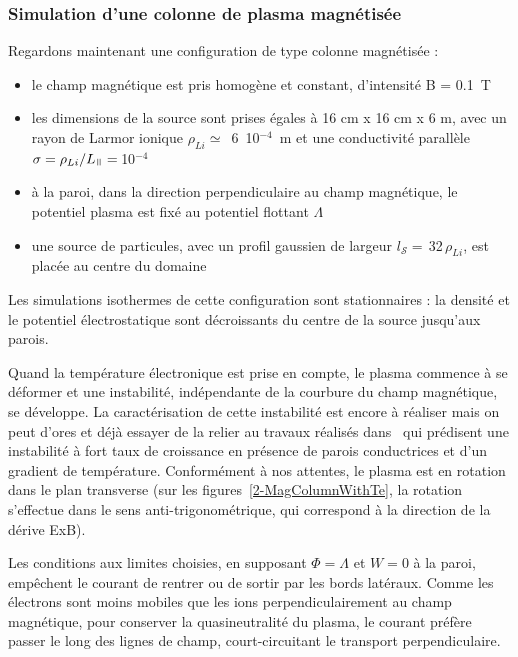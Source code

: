 \begin{refsection}
\subsubsection{Simulation d'une colonne de plasma magnétisée}
Regardons maintenant une configuration de type colonne magnétisée : 

\begin{itemize}
  \item le champ magnétique est pris homogène et constant, d'intensité B = 0.1~T
  \item les dimensions de la source sont prises égales à 16 cm x
  16 cm x 6 m, avec un rayon
  de Larmor ionique $\rho_{Li}\simeq$~6~10$^{-4}$~m et une conductivité
  parallèle $\sigma=\rho_{Li}/L_\para=\,$10$^{-4}$
  \item à la paroi, dans la direction perpendiculaire au champ magnétique, le
  potentiel plasma est fixé au potentiel flottant $\Lambda$
  \item une source de particules, avec un profil gaussien de largeur
  $l_{\mathcal S}=\,$32$\,\rho_{Li}$, est placée au centre du domaine
\end{itemize}

Les simulations isothermes de cette configuration sont stationnaires : la
densité et le potentiel électrostatique sont décroissants du centre de la
source jusqu'aux parois. 

Quand la température électronique est prise en compte,
le plasma commence à se déformer et une instabilité, indépendante de la
courbure du champ magnétique, se développe.
La caractérisation de cette instabilité est encore à réaliser
mais on peut d'ores et déjà essayer de la relier au travaux
réalisés dans~\parencite{Berk} qui prédisent une instabilité à fort taux de
croissance en présence de parois conductrices et d'un gradient de température.
Conformément à nos attentes, le plasma est en rotation dans le plan transverse (sur les
figures~\ref{2-MagColumnWithTe}, la rotation s'effectue dans le sens
anti-trigonométrique, qui correspond à la direction de la dérive ExB).

Les conditions aux limites choisies, en supposant $\Phi=\Lambda$ et $W=0$ à la
paroi, empêchent le courant de rentrer ou de sortir par les bords latéraux.
Comme les électrons sont moins mobiles que les ions perpendiculairement au champ
magnétique, pour conserver
la quasineutralité du plasma, le courant préfère passer le long des lignes de
champ, court-circuitant le transport perpendiculaire.


\end{refsection}
